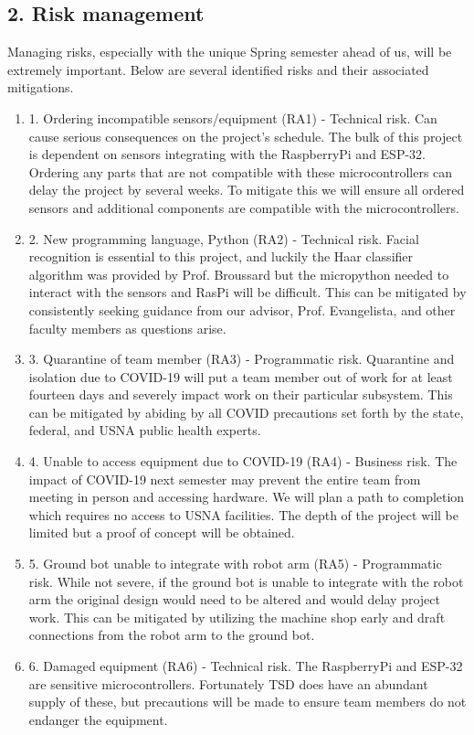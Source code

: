 ﻿\documentclass[10pt]{article}
\begin{document}
\subsection{2. Risk management}
Managing risks, especially with the unique Spring semester ahead of us, will be extremely important. Below are several identified risks and their associated mitigations.
\begin{enumerate}
\item 1. Ordering incompatible sensors/equipment (RA1) - Technical risk. Can cause serious consequences on the project’s schedule. The bulk of this project is dependent on sensors integrating with the RaspberryPi and ESP-32. Ordering any parts that are not compatible with these microcontrollers can delay the project by several weeks. To mitigate this we will ensure all ordered sensors and additional components are compatible with the microcontrollers.

\item 2. New programming language, Python (RA2) - Technical risk. Facial recognition is essential to this project, and luckily the Haar classifier algorithm was provided by Prof. Broussard but the micropython needed to interact with the sensors and RasPi will be difficult. This can be mitigated by consistently seeking guidance from our advisor, Prof. Evangelista, and other faculty members as questions arise.
 
\item 3. Quarantine of team member (RA3) - Programmatic risk. Quarantine and isolation due to COVID-19 will put a team member out of work for at least fourteen days and severely impact work on their particular subsystem. This can be mitigated by abiding by all COVID precautions set forth by the state, federal, and USNA public health experts.

\item 4. Unable to access equipment due to COVID-19 (RA4) - Business risk. The impact of COVID-19 next semester may prevent the entire team from meeting in person and accessing hardware. We will plan a path to completion which requires no access to USNA facilities. The depth of the project will be limited but a proof of concept will be obtained.

\item 5. Ground bot unable to integrate with robot arm (RA5) - Programmatic risk. While not severe, if the ground bot is unable to integrate with the robot arm the original design would need to be altered and would delay project work. This can be mitigated by utilizing the machine shop early and draft connections from the robot arm to the ground bot.

\item 6. Damaged equipment (RA6) - Technical risk. The RaspberryPi and ESP-32 are sensitive microcontrollers. Fortunately TSD does have an abundant supply of these, but precautions will be made to ensure team members do not endanger the equipment.
\end{enumerate}
\end{document}
